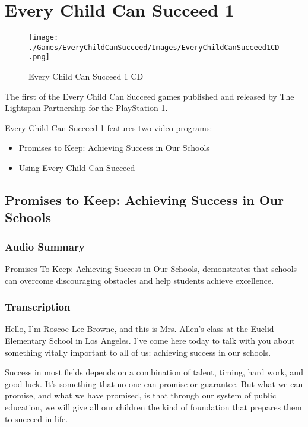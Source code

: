 \chapter{Every Child Can Succeed 1}

\begin{figure}[H]
    \centering
    \texttt{[image: ./Games/EveryChildCanSucceed/Images/EveryChildCanSucceed1CD.png]}
    \caption{Every Child Can Succeed 1 CD}
\end{figure}

The first of the Every Child Can Succeed games published and released by The Lightspan Partnership for the PlayStation 1.

Every Child Can Succeed 1 features two video programs:

\begin{itemize}
    \item Promises to Keep: Achieving Success in Our Schools
    \item Using Every Child Can Succeed
\end{itemize}

\clearpage
\newpage

\section{Promises to Keep: Achieving Success in Our Schools}

\subsection{Audio Summary}

Promises To Keep: Achieving Success in Our Schools, demonstrates that schools can overcome discouraging obstacles and help students achieve excellence.

\subsection{Transcription}

Hello, I'm Roscoe Lee Browne, and this is Mrs. Allen's class at the Euclid Elementary School in Los Angeles.
I've come here today to talk with you about something vitally important to all of us: achieving success in our schools.

Success in most fields depends on a combination of talent, timing, hard work, and good luck.
It's something that no one can promise or guarantee.
But what we can promise, and what we have promised, is that through our system of public education, we will give all our children the kind of foundation that prepares them to succeed in life.

